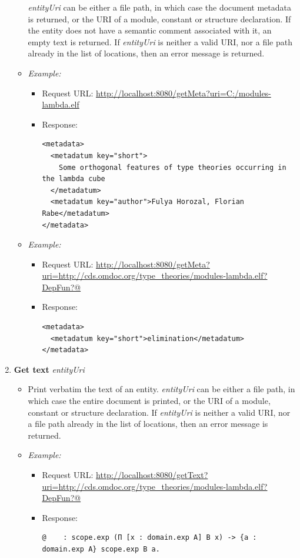 \begin{enumerate}
\begin{itemize}
 \textit{entityUri} can be either a file path, in which case the document metadata is returned, or the URI of a module, constant or structure declaration. If the entity does not have a semantic comment associated with it, an empty text is returned. If \textit{entityUri} is neither a valid URI, nor a file path already in the list of locations, then an error message is returned.
	\item \textit{Example:} 
		\begin{itemize}
		\item Request URL:  \url{http://localhost:8080/getMeta?uri=C:/modules-lambda.elf}
		\item Response: 
		\begin{verbatim}<metadata>
  <metadatum key="short">
    Some orthogonal features of type theories occurring in the lambda cube
  </metadatum>
  <metadatum key="author">Fulya Horozal, Florian Rabe</metadatum>
</metadata>\end{verbatim}
		\end{itemize}
	\item \textit{Example:} 
		\begin{itemize}
		\item Request URL:  \url{http://localhost:8080/getMeta?uri=http://cds.omdoc.org/type\_theories/modules-lambda.elf?DepFun?@}
		\item Response: 
		\begin{verbatim}<metadata>
  <metadatum key="short">elimination</metadatum>
</metadata>\end{verbatim}
		\end{itemize}
	\end{itemize}


\item \textbf{Get text} \qquad  {}\textit{entityUri}
	\begin{itemize}
	\item Print verbatim the text of an entity. \textit{entityUri} can be either a file path, in which case the entire document is printed, or the URI of a module, constant or structure declaration. If \textit{entityUri} is neither a valid URI, nor a file path already in the list of locations, then an error message is returned.
	\item \textit{Example:} 
		\begin{itemize}
		\item Request URL:  \url{http://localhost:8080/getText?uri=http://cds.omdoc.org/type\_theories/modules-lambda.elf?DepFun?@}
		\item Response: 
		\begin{verbatim}@    : scope.exp (Π [x : domain.exp A] B x) -> {a : domain.exp A} scope.exp B a.\end{verbatim}
		\end{itemize}
	\end{itemize}



\end{enumerate}
